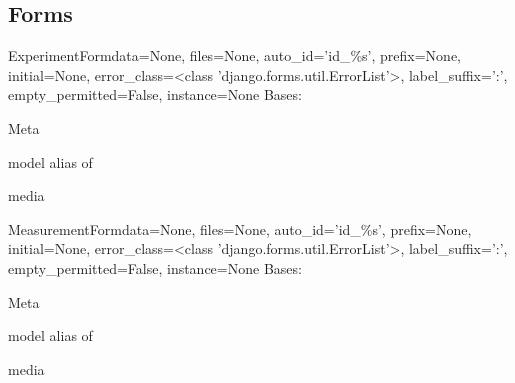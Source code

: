 \documentclass[letterpaper,10pt,english]{sphinxmanual}
\begin{document}
\subsection{Forms}
\hypertarget{module-data.forms}{}
\modulesynopsis{}

\hypertarget{data.forms.ExperimentForm}{}\begin{classdesc}{ExperimentForm}{data=None, files=None, auto\_id='id\_\%s', prefix=None, initial=None, error\_class=\textless{}class 'django.forms.util.ErrorList'\textgreater{}, label\_suffix=':', empty\_permitted=False, instance=None}
Bases: 

\hypertarget{data.forms.ExperimentForm.Meta}{}\begin{classdesc}{Meta}{}~

\hypertarget{data.forms.ExperimentForm.Meta.model}{}\begin{memberdesc}{model}
alias of 
\end{memberdesc}
\end{classdesc}

\hypertarget{data.forms.ExperimentForm.media}{}\begin{memberdesc}[ExperimentForm]{media}\end{memberdesc}
\end{classdesc}

\hypertarget{data.forms.MeasurementForm}{}\begin{classdesc}{MeasurementForm}{data=None, files=None, auto\_id='id\_\%s', prefix=None, initial=None, error\_class=\textless{}class 'django.forms.util.ErrorList'\textgreater{}, label\_suffix=':', empty\_permitted=False, instance=None}
Bases: 

\hypertarget{data.forms.MeasurementForm.Meta}{}\begin{classdesc}{Meta}{}~

\hypertarget{data.forms.MeasurementForm.Meta.model}{}\begin{memberdesc}{model}
alias of 
\end{memberdesc}
\end{classdesc}

\hypertarget{data.forms.MeasurementForm.media}{}\begin{memberdesc}[MeasurementForm]{media}\end{memberdesc}
\end{classdesc}
\end{document}
